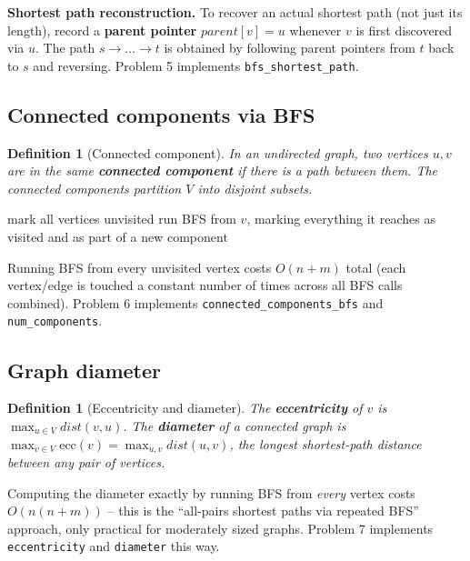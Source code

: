 \documentclass[11pt]{article}
\newtheorem{definition}[theorem]{Definition}
\begin{document}
\textbf{Shortest path reconstruction.} To recover an actual shortest path (not just its
length), record a \textbf{parent pointer} $parent[v] = u$ whenever $v$ is first
discovered via $u$. The path $s \to \dots \to t$ is obtained by following parent pointers
from $t$ back to $s$ and reversing. Problem 5 implements
\texttt{bfs\_shortest\_path}.

\subsection{Connected components via BFS}

\begin{definition}[Connected component]
In an undirected graph, two vertices $u, v$ are in the same \textbf{connected component}
if there is a path between them. The connected components partition $V$ into disjoint
subsets.
\end{definition}

\begin{algorithm}[h]
\caption{Connected components via BFS}
\begin{algorithmic}[1]
\State mark all vertices unvisited
        \State run BFS from $v$, marking everything it reaches as visited and as part of a
        new component
    \EndIf
\EndFor
\end{algorithmic}
\end{algorithm}

Running BFS from every unvisited vertex costs $O(n+m)$ total (each vertex/edge is touched
a constant number of times across all BFS calls combined). Problem 6 implements
\texttt{connected\_components\_bfs} and \texttt{num\_components}.

\subsection{Graph diameter}

\begin{definition}[Eccentricity and diameter]
The \textbf{eccentricity} of $v$ is $\max_{u \in V} dist(v,u)$. The \textbf{diameter} of a
connected graph is $\max_{v \in V} \mathrm{ecc}(v) = \max_{u,v} dist(u,v)$, the longest
shortest-path distance between any pair of vertices.
\end{definition}

Computing the diameter exactly by running BFS from \emph{every} vertex costs $O(n(n+m))$
-- this is the ``all-pairs shortest paths via repeated BFS'' approach, only practical for
moderately sized graphs. Problem 7 implements \texttt{eccentricity} and \texttt{diameter}
this way.
\end{document}
